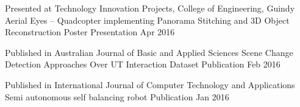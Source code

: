 

\begin{cventries}
  \cventry
    {Presented at Technology Innovation Projects, College of Engineering, Guindy} %
    {Aerial Eyes – Quadcopter implementing Panorama Stitching and 3D Object Reconstruction} %
    {Poster Presentation} %
    {Apr 2016} %
    {}


  \cventry
    {Published in Australian Journal of Basic and Applied Sciences} %
    {Scene Change Detection Approaches Over UT Interaction Dataset} %
    {Publication}
    {Feb 2016} %
    {}

  \cventry
    {Published in International Journal of Computer Technology and Applications} %
    {Semi autonomous self balancing robot} %
    {Publication} %
    {Jan 2016} %
    {}

\end{cventries}
